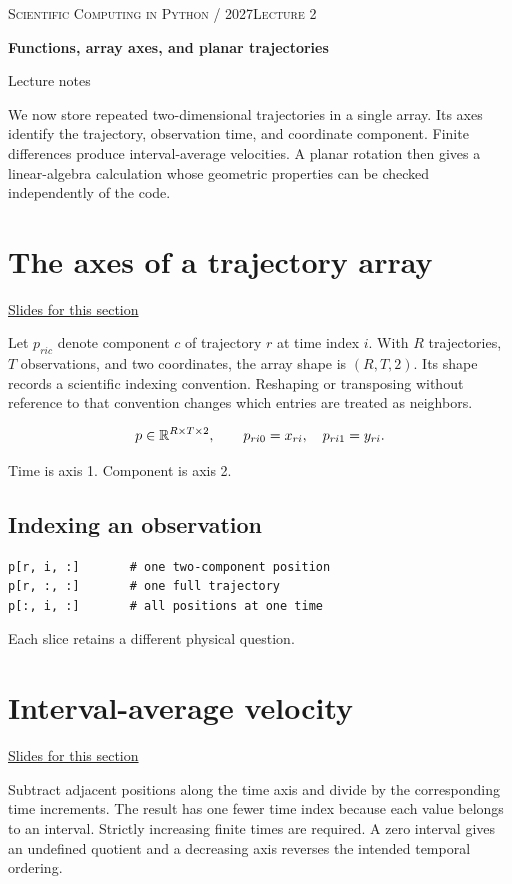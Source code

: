 \documentclass[11pt,letterpaper]{article}
\theoremstyle{definition}\newtheorem{definition}{Definition}\newtheorem{example}{Example}
\numberwithin{equation}{section}
\begin{document}
{\small\scshape Scientific Computing in Python / 2027\hfill Lecture 2}\par\medskip
{\raggedright{}\LARGE\bfseries\color{ink} Functions, array axes, and planar trajectories\par}\medskip
{\small Lecture notes}\par\bigskip
We now store repeated two-dimensional trajectories in a single array. Its axes identify the trajectory, observation time, and coordinate component. Finite differences produce interval-average velocities. A planar rotation then gives a linear-algebra calculation whose geometric properties can be checked independently of the code.

\section{The axes of a trajectory array}
\hypertarget{note-the-axes-of-a-trajectory-array}{}\label{note:the-axes-of-a-trajectory-array}
{\small \href{slides.html\#frame=the-axes-of-a-trajectory-array\&step=1}{Slides for this section}}\par
Let $p_{ric}$ denote component $c$ of trajectory $r$ at time index $i$. With $R$ trajectories, $T$ observations, and two coordinates, the array shape is $(R,T,2)$. Its shape records a scientific indexing convention. Reshaping or transposing without reference to that convention changes which entries are treated as neighbors.

\[
p\in\mathbb{R}^{R\times T\times2},\qquad p_{ri0}=x_{ri},\quad p_{ri1}=y_{ri}.
\]

Time is axis 1. Component is axis 2.

\subsection*{Indexing an observation}
\begin{minipage}{\linewidth}
\begin{verbatim}
p[r, i, :]       # one two-component position
p[r, :, :]       # one full trajectory
p[:, i, :]       # all positions at one time
\end{verbatim}
\end{minipage}

Each slice retains a different physical question.
\section{Interval-average velocity}
\hypertarget{note-interval-average-velocity}{}\label{note:interval-average-velocity}
{\small \href{slides.html\#frame=interval-average-velocity\&step=1}{Slides for this section}}\par
Subtract adjacent positions along the time axis and divide by the corresponding time increments. The result has one fewer time index because each value belongs to an interval. Strictly increasing finite times are required. A zero interval gives an undefined quotient and a decreasing axis reverses the intended temporal ordering.
\end{document}
